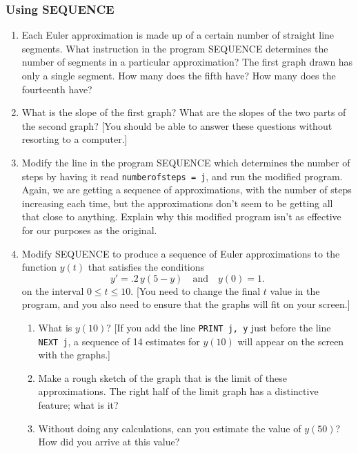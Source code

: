 \subsubsection{Using SEQUENCE}
\label{subsubsec:using-sequence}




\begin{enumerate}
\item Each Euler approximation is made up of a certain number of
 straight line segments.  What instruction in the program SEQUENCE
 determines the number of segments in a particular approximation?  The
 first graph drawn has only a single segment.  How many does the fifth
 have? How many does the fourteenth have?


\item What is the slope of the first graph?  What are the slopes of the
 two parts of the second graph?  [You should be able to answer these
 questions without resorting to a computer.]


\item Modify the line in the program SEQUENCE which determines the
 number of steps by having it read {\tt numberofsteps = j}, and run
 the modified program.  Again, we are getting a sequence of
 approximations, with the number of steps increasing each time, but
 the approximations don't seem to be getting all that close to
 anything.  Explain why this modified program isn't as effective for
 our purposes as the original.


\item Modify SEQUENCE to produce a sequence of Euler approximations to
 the function $y(t)$ that satisfies the conditions
\[
y' = .2\, y(5 - y) \quad \mbox{and} \quad y(0) = 1.
\]
on the interval $0 \leq t \leq 10$.  [You need to change the final $t$
 value in the program, and you also need to ensure that the graphs
 will fit on your screen.]  
  \begin{enumerate}
  \item What is $y(10)$?  [If you add the
 line {\tt PRINT j, y} just before the line {\tt NEXT j}, a sequence
 of 14 estimates for $y(10)$ will appear on the screen with the
 graphs.]  
  \item Make a rough sketch of the graph that is the limit of
 these approximations.  The right half of the limit graph has a
 distinctive feature; what is it?

  \item Without doing any
 calculations, can you estimate the value of $y(50)$?  How did you
 arrive at this value?


\end{enumerate}
\end{enumerate}
